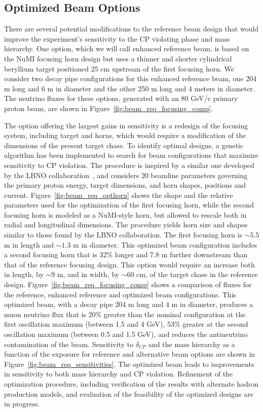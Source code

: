 \subsection{Optimized Beam Options}
\label{sec:alternative-focusing-systems}

There are several potential modifications to the reference beam design that would improve the experiment's sensitivity to the CP violating phase and mass hierarchy. 
One option, which we will call enhanced reference beam, is based on 
the NuMI focusing horn design but uses a thinner and shorter 
cylindrical beryllium target positioned 25 cm upstream of the first 
focusing horn. We consider two decay pipe configurations for this 
enhanced reference beam, one 204 m long and 6 m in diameter and the other 
250 m long and 4 meters in diameter.  The neutrino fluxes for these 
options, generated with an 80 GeV/c primary proton beam, are shown in 
Figure~\ref{fig:beam_req_focusing_comp}. 
  
The option offering the largest gains in sensitivity is a redesign of the focusing system, including target and horns, which would require a modification of the dimensions 
of the present target chase.  To identify optimal designs, a genetic algorithm has been implemented to search for beam configurations that maximize sensitivity to CP violation. 
The procedure is inspired by a similar one developed by the LBNO collaboration~\cite{Agarwalla:2014tca}, and considers 20 beamline parameters governing the primary proton energy, target dimensions, 
and horn shapes, positions and current. Figure~\ref{fig:beam_req_opthorn} shows the shape and the relative parameters used for the optimization of the first focusing horn, 
while the second focusing horn is modeled as a NuMI-style horn, but allowed to rescale both in radial and longitudinal dimensions. The procedure yields horn size and shapes 
similar to those found by the LBNO collaboration. The first focusing horn is $\sim 5.5$ m in length and $\sim 1.3$ m in diameter. This 
optimized beam configuration includes a second focusing horn that is 32\% longer and 7.8 m further downstream than that of the reference focusing design.  This option would 
require an increase both in length, by $\sim 9$ m, and in width, by 
$\sim 60$ cm, of the target chase in the reference design.  Figure~\ref{fig:beam_req_focusing_comp} shows a comparison of fluxes 
for the reference, enhanced reference and optimized beam configurations. This
optimized beam, with a decay pipe 204 m long and 4 m in diameter,
produces a muon neutrino flux that is 20\% greater than the nominal
configuration at the first oscillation maximum (between 1.5 and 4 GeV), 
53\% greater at the second oscillation maximum (between 0.5 and 1.5 GeV), and reduces the
antineutrino contamination of the beam.   Sensitivity to $\delta_{CP}$ and the mass hierarchy as 
a function of the exposure for reference and alternative beam options
are shown in Figure~\ref{fig:beam_req_sensitivities}.  The optimized beam leads to improvements in sensitivity to both mass hierarchy 
and CP violation. Refinement of the optimization procedure, including
verification of the results with alternate hadron production models, and evaluation of the feasibility of the optimized designs are in progress. 

